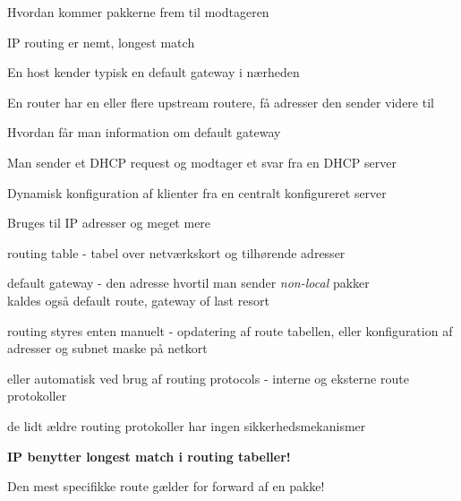 \documentclass[Screen16to9,17pt]{foils}
\begin{document}

Hvordan kommer pakkerne frem til modtageren



\begin{list1}
\item IP routing er nemt, longest match
\item En host kender typisk en default gateway i nærheden
\item En router har en eller flere upstream routere, få adresser den sender videre til
\end{list1}





\begin{list1}
\item Hvordan får man information om default gateway
\item Man sender et DHCP request og modtager et svar fra en DHCP server
\item Dynamisk konfiguration af klienter fra en centralt konfigureret server
\item Bruges til IP adresser og meget mere
\end{list1}




\begin{list1}
  \item routing table - tabel over netværkskort og tilhørende adresser
\item default gateway - den adresse hvortil man sender
  \emph{non-local} pakker\\kaldes også default route, gateway of last
  resort
\item routing styres enten manuelt - opdatering af route tabellen,
  eller konfiguration af adresser og subnet maske på netkort
\item eller automatisk ved brug af routing protocols - interne og
  eksterne route protokoller
\item de lidt ældre routing protokoller har ingen sikkerhedsmekanismer
\item {\bf IP benytter longest match i routing tabeller!}
\item Den mest specifikke route gælder for forward af en pakke!
\end{list1}
\end{document}
